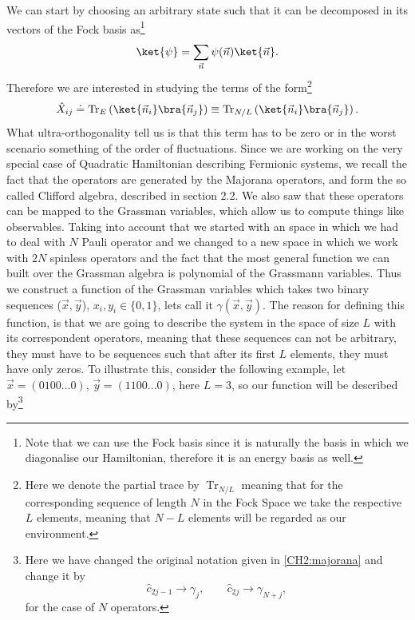 \indent We can start by choosing an arbitrary state such that it can be decomposed in its vectors of the Fock basis as\footnote{Note that we can use the Fock basis since it is naturally the basis in which we diagonalise our Hamiltonian, therefore it is an energy basis as well.}
\begin{equation}
\ket{\psi} = \sum_{\vec{n}}\psi(\vec{n})\ket{\vec{n}}.
\end{equation}
Therefore we are interested in studying the terms of the form\footnote{Here we denote the partial trace by $\operatorname{Tr}_{N/L}$ meaning that for the corresponding sequence of length $N$ in the Fock Space we take the respective $L$ elements, meaning that $N-L$ elements will be regarded as our environment.}
\begin{equation}
\hat{X}_{ij} \doteq \operatorname{Tr}_{E}\left(\ket{\vec{n}_i}\bra{\vec{n}_j}\right) \equiv \operatorname{Tr}_{N/L}\left(\ket{\vec{n}_i}\bra{\vec{n}_j}\right).
\end{equation}
\indent What ultra-orthogonality tell us is that this term has to be zero or in the worst scenario something of the order of fluctuations. Since we are working on the very special case of Quadratic Hamiltonian describing Fermionic systems, we recall the fact that the operators are generated by the Majorana operators, and form the so called Clifford algebra, described in section 2.2. We also saw that these operators can be mapped to the Grassman variables, which allow us to compute things like observables. Taking into account that we started with an space in which we had to deal with $N$ Pauli operator and we changed to a new space in which we work with $2N$ spinless operators and the fact that the most general  function we can built over the Grassman algebra is polynomial of the Grassmann variables. Thus we construct a function of the Grassman variables which takes two binary sequences ($\vec{x},\vec{y}$), $x_i,y_i \in \{0,1\}$, lets call it $\gamma(\vec{x},\vec{y})$. The reason for defining this function, is that we are going to describe the system in the space of size $L$ with its correspondent operators, meaning that these sequences can not be arbitrary, they must have to be sequences such that after its first $L$ elements, they must have only zeros. To illustrate this, consider the following example, let $\vec{x}=(0100\ldots 0)$, $\vec{y}=(1100\ldots 0)$, here $L=3$, so our function will be described by\footnote{Here we have changed the original notation given in \eqref{CH2:majorana} and change it by 
\begin{equation}
\hat{c}_{2j-1}\rightarrow \gamma_{j} , \qquad \hat{c}_{2j}\rightarrow \gamma_{N+j},
\end{equation}
for the case of $N$ operators.
}
